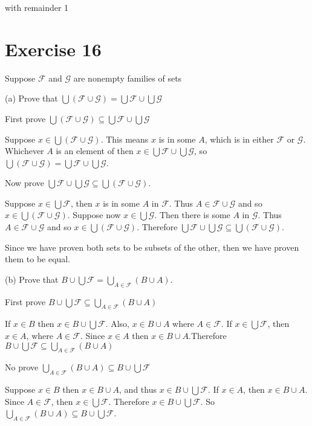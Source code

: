 \documentclass[11pt]{article}
\newcommand{\family}[1]{\mathcal{#1}}
\begin{document}
with remainder 1

\section*{Exercise 16}

Suppose $\family{F}$ and $\family{G}$ are nonempty families of sets

\noindent (a) Prove that $\bigcup (\family{F} \cup \family{G}) = \bigcup \family{F} \cup \bigcup \family{G}$

First prove $\bigcup (\family{F} \cup \family{G}) \subseteq \bigcup \family{F} \cup \bigcup \family{G}$

Suppose $x \in \bigcup (\family{F} \cup \family{G})$. This means $x$ is in some 
$A$, which is in either $\family{F}$ or $\family{G}$. Whichever $A$ is an element of 
then $x \in \bigcup \family{F} \cup \bigcup \family{G}$, so 
$\bigcup (\family{F} \cup \family{G}) = \bigcup \family{F} \cup \bigcup \family{G}$.

Now prove $\bigcup \family{F} \cup \bigcup \family{G} \subseteq \bigcup (\family{F} \cup \family{G})$.

Suppose $x \in \bigcup \family{F}$, then $x$ is in some $A$ in $\family{F}$. 
Thus $A \in \family{F} \cup \family{G}$ and so $x \in \bigcup (\family{F} \cup \family{G})$.
Suppose now $x \in \bigcup \family{G}$. Then there is some $A$ in $\family{G}$.
Thus $A \in \family{F} \cup \family{G}$ and so $x \in \bigcup (\family{F} \cup \family{G})$.
Therefore $\bigcup \family{F} \cup \bigcup \family{G} \subseteq \bigcup (\family{F} \cup \family{G})$.

Since we have proven both sets to be subsets of the other, then we have proven 
them to be equal.

\noindent (b) Prove that $B \cup \bigcup \family{F} = \bigcup_{A \in \family{F}} (B \cup A)$.

First prove $B \cup \bigcup \family{F} \subseteq \bigcup_{A \in \family{F}} (B \cup A)$

If $x \in B$ then $x \in B \cup \bigcup \family{F}$.
Also, $x \in B \cup A$ where $A \in \family{F}$. 
If $x \in \bigcup \family{F}$, then $x \in A$, where $A \in \family{F}$. Since 
$x \in A$ then $x \in B \cup A$.Therefore 
$B \cup \bigcup \family{F} \subseteq \bigcup_{A \in \family{F}} (B \cup A)$

No prove $\bigcup_{A \in \family{F}} (B \cup A) \subseteq B \cup \bigcup \family{F}$

Suppose $x \in B$ then $x \in B \cup A$, and thus $x \in B \cup \bigcup \family{F}$.
If $x \in A$, then $x \in B \cup A$. Since $A \in \family{F}$, then 
$x \in \bigcup \family{F}$. Therefore $x \in B \cup \bigcup \family{F}$. 
So $\bigcup_{A \in \family{F}} (B \cup A) \subseteq B \cup \bigcup \family{F}$.
\end{document}

